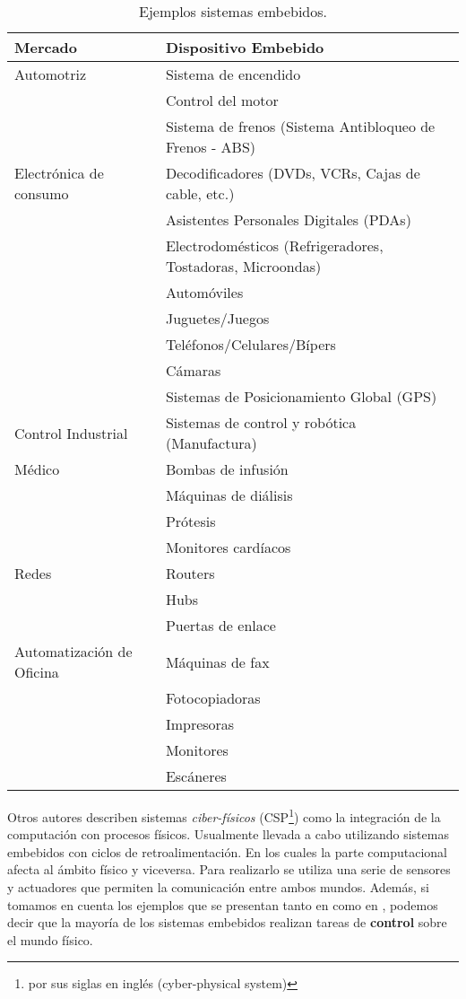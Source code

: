 \begin{table}[h]
\caption{Ejemplos sistemas embebidos.}
    \centering
    \label{tab:ejSistEmbebidos}
    \begin{tabular}{|l|l|}
        \hline
        \textbf{Mercado} & \textbf{Dispositivo Embebido} \\ \hline
        Automotriz & Sistema de encendido \\ 
        & Control del motor \\ 
        & Sistema de frenos (Sistema Antibloqueo de Frenos - ABS) \\ \hline
        Electrónica de consumo & Decodificadores (DVDs, VCRs, Cajas de cable, etc.) \\ 
        & Asistentes Personales Digitales (PDAs) \\ 
        & Electrodomésticos (Refrigeradores, Tostadoras, Microondas) \\ 
        & Automóviles \\ 
        & Juguetes/Juegos \\ 
        & Teléfonos/Celulares/Bípers \\ 
        & Cámaras \\ 
        & Sistemas de Posicionamiento Global (GPS) \\ \hline
        Control Industrial & Sistemas de control y robótica (Manufactura) \\ \hline
        Médico & Bombas de infusión \\ 
        & Máquinas de diálisis \\ 
        & Prótesis \\ 
        & Monitores cardíacos \\ \hline
        Redes & Routers \\ 
        & Hubs \\ 
        & Puertas de enlace \\ \hline
        Automatización de Oficina & Máquinas de fax \\ 
        & Fotocopiadoras \\ 
        & Impresoras \\ 
        & Monitores \\ 
        & Escáneres \\ \hline
    \end{tabular}
    \label{tab:sistemas_embebidos}
\end{table}

Otros autores \cite{lee2017introduction} describen sistemas \textit{ciber-físicos} (CSP\footnote{por sus siglas en inglés (cyber-physical system)}) como la integración de la computación con procesos físicos. Usualmente llevada a cabo utilizando sistemas embebidos con ciclos de retroalimentación. En los cuales la parte computacional afecta al ámbito físico y viceversa. Para realizarlo se utiliza una serie de sensores y actuadores que permiten la comunicación entre ambos mundos.
Además, si tomamos en cuenta los ejemplos que se presentan tanto en \cite{noergaard2005embedded} como en \cite{lee2017introduction}, podemos decir que la mayoría de los sistemas embebidos realizan tareas de \textbf{control} sobre el mundo físico.

